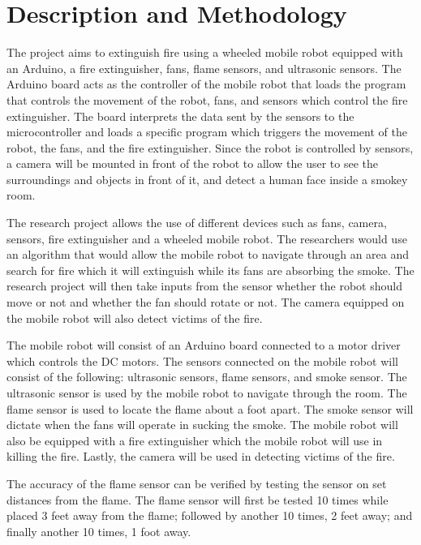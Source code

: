 \section{Description and Methodology}

	The project aims to extinguish fire using a wheeled mobile robot equipped with an Arduino, a fire extinguisher, fans, flame sensors, and ultrasonic sensors. The Arduino board acts as the controller of the mobile robot that loads the program that controls the movement of the robot, fans, and sensors which control the fire extinguisher. The board interprets the data sent by the sensors to the microcontroller and loads a specific program which triggers the movement of the robot, the fans, and the fire extinguisher. Since the robot is controlled by sensors, a camera will be mounted in front of the robot to allow the user to see the surroundings and objects in front of it, and detect a human face inside a smokey room.
	
	The research project allows the use of different devices such as fans, camera, sensors, fire extinguisher and a wheeled mobile robot. The researchers would use an algorithm that would allow the mobile robot to navigate through an area and search for fire which it will extinguish while its fans are absorbing the smoke. The research project will then take inputs from the sensor whether the robot should move or not and whether the fan should rotate or not. The camera equipped on the mobile robot will also detect victims of the fire.

	The mobile robot will consist of an Arduino board connected to a motor driver which controls the DC motors. The sensors connected on the mobile robot will consist of the following: ultrasonic sensors, flame sensors, and smoke sensor. The ultrasonic sensor is used by the mobile robot to navigate through the room. The flame sensor is used to locate the flame about a foot apart. The smoke sensor will dictate when the fans will operate in sucking the smoke. The mobile robot will also be equipped with a fire extinguisher which the mobile robot will use in killing the fire. Lastly, the camera will be used in detecting victims of the fire.
	
	The accuracy of the flame sensor can be verified by testing the sensor on set distances from the flame. The flame sensor will first be tested 10 times while placed 3 feet away from the flame; followed by another 10 times, 2 feet away; and finally another 10 times, 1 foot away.
	
